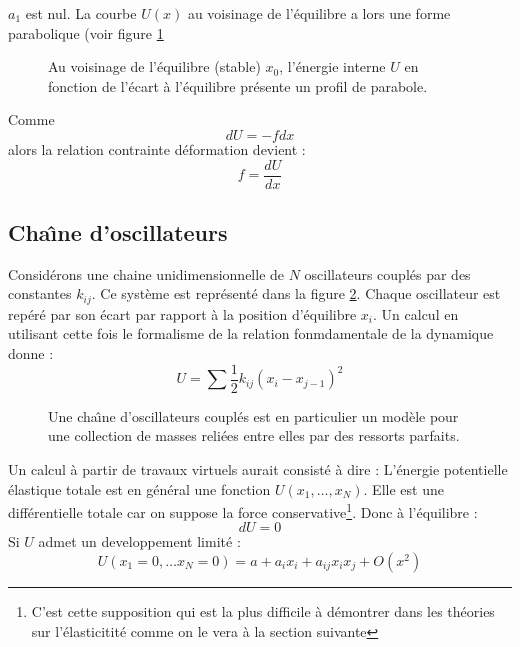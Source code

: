 \documentclass[12pt]{book}
\begin{document}
$a_1$ est nul. La courbe $U(x)$ au voisinage de l'\'equilibre a lors
une forme parabolique (voir figure \ref{figparabe}
\begin{figure}[htb]
 \centerline{}   
 \caption{Au voisinage de l'\'equilibre (stable) $x_0$, l'\'energie
interne $U$ en fonction de l'\'ecart \`a l'\'equilibre pr\'esente un
profil de parabole.}
 \label{figparabe}
\end{figure}
Comme 
\begin{equation}
dU=-fdx
\end{equation}
alors la relation contrainte d\'eformation devient :
\begin{equation}
f=\frac{dU}{dx}
\end{equation}
\subsection{Cha\^\i ne d'oscillateurs}
Consid\'erons une chaine unidimensionnelle de $N$ oscillateurs coupl\'es par
des constantes $k_{ij}$. Ce syst\`eme est repr\'esent\'e dans la
figure \ref{figchaineosc}. Chaque
oscillateur est rep\'er\'e par son \'ecart par rapport \`a la position
d'\'equilibre  $x_i$. 
Un calcul en utilisant cette fois le formalisme de la relation
fonmdamentale de la dynamique donne :
\begin{equation}
U=\sum\frac{1}{2}k_{ij}(x_i-x_{j-1})^2
\end{equation}
\begin{figure}[htb]
 \centerline{}   
 \caption{Une cha\^\i ne d'oscillateurs coupl\'es est en particulier
un mod\`ele pour une collection de masses reli\'ees entre elles par
des ressorts parfaits.}
 \label{figchaineosc}
\end{figure}
Un calcul \`a partir de travaux virtuels aurait consist\'e \`a dire :
L'\'energie potentielle \'elastique totale 
est en g\'en\'eral une fonction $U(x_1,\dots, x_N)$. 
Elle est une diff\'erentielle totale car on suppose la force
conservative\footnote{C'est cette supposition qui est la plus difficile \`a
d\'emontrer dans les th\'eories sur l'\'elasticitit\'e comme on le vera
\`a la section suivante}. Donc \`a l'\'equilibre :
\begin{equation}
dU=0
\end{equation}
Si $U$ admet un developpement limit\'e :
\begin{equation}\label{eqdevliUch}
U(x_1=0,\dots x_N=0)=a+a_i x_i+a_{ij}x_ix_j+O(x^2)
\end{equation}
\end{document}
